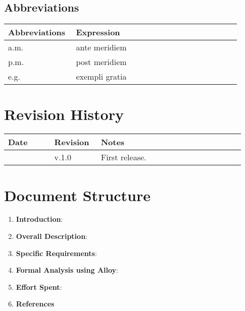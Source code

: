 \subsection{Abbreviations}

\begin{center}
	\begin{longtable}{@{}p{0.28\linewidth} p{0.68\linewidth}@{}}
		\toprule
		\textbf{Abbreviations}  & \textbf{Expression}\\
		\midrule
	    a.m. & ante meridiem\\
	    p.m. & post meridiem\\
	    e.g. & exempli gratia\\
		\bottomrule
	\end{longtable}
\end{center}

\section{Revision History}

\begin{center}
	\begin{longtable}{@{}p{0.18\linewidth} p{0.18\linewidth} p{0.57\linewidth}@{}}
		\toprule
		\textbf{Date}   & \textbf{Revision} & \textbf{Notes}\\
		\midrule
        \date{}      & v.1.0             & First release.\\
		\bottomrule
	\end{longtable}
\end{center}

\printbibliography[title={Reference Documents},keyword=intro, heading=subbibnumbered]

\section{Document Structure}

\begin{enumerate}
    \item \textbf{Introduction}:
    \item \textbf{Overall Description}:
    \item \textbf{Specific Requirements}:
    \item \textbf{Formal Analysis using Alloy}:
    \item \textbf{Effort Spent}:
    \item \textbf{References}
\end{enumerate}
